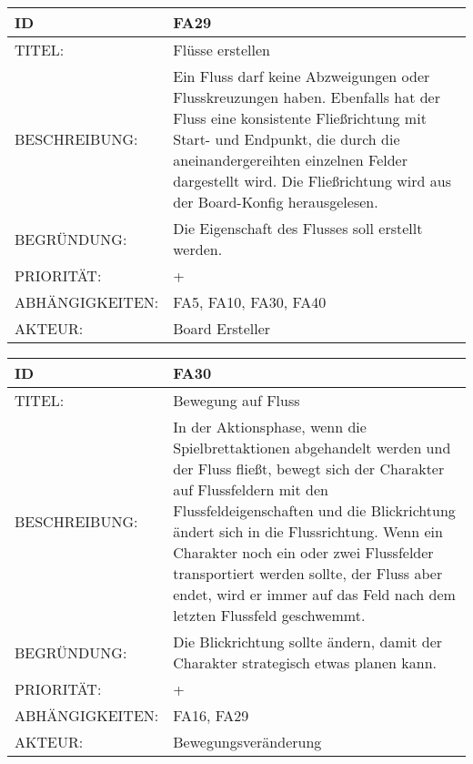 \documentclass{uulm-assignment}
\begin{document}
    \begin{tabularx}{\textwidth}{|l|X |} \hline
        \textbf{ID} & \textbf{FA29} \\
        \hline
        TITEL: & Flüsse erstellen\\
        \hline
        BESCHREIBUNG: &  Ein Fluss darf keine Abzweigungen oder Flusskreuzungen haben. Ebenfalls hat der Fluss eine konsistente
Fließrichtung mit Start- und Endpunkt, die durch die aneinandergereihten einzelnen Felder dargestellt wird. Die Fließrichtung wird aus der Board-Konfig herausgelesen. 
        \\
        \hline
        BEGRÜNDUNG: & Die Eigenschaft des Flusses soll erstellt werden.\\
        \hline
        PRIORITÄT: & +\\
        \hline
        ABHÄNGIGKEITEN: & FA5, FA10, FA30, FA40\\
        \hline
        AKTEUR: & Board Ersteller\\
        \hline
    \end{tabularx}
    
    \begin{tabularx}{\textwidth}{|l|X |} \hline
        \textbf{ID} & \textbf{FA30} \\
        \hline
        TITEL: & Bewegung auf Fluss\\
        \hline
        BESCHREIBUNG: & In der Aktionsphase, wenn die Spielbrettaktionen abgehandelt werden
und der Fluss fließt, bewegt sich der Charakter auf Flussfeldern mit den Flussfeldeigenschaften und die Blickrichtung ändert sich in die Flussrichtung. Wenn ein Charakter noch ein oder zwei Flussfelder transportiert werden sollte, der Fluss aber
endet, wird er immer auf das Feld nach dem letzten Flussfeld geschwemmt.
        \\
        \hline
        BEGRÜNDUNG: & Die Blickrichtung sollte ändern, damit der Charakter strategisch etwas planen kann.\\
        \hline
        PRIORITÄT: & +\\
        \hline
        ABHÄNGIGKEITEN: & FA16, FA29\\
        \hline
        AKTEUR: & Bewegungsveränderung \\
        \hline
    \end{tabularx}
    
\end{document}
